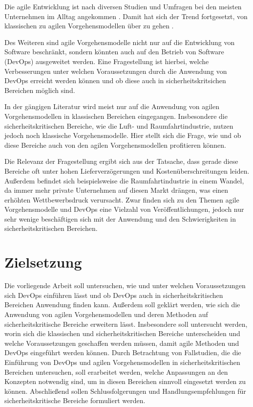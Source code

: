 Die agile Entwicklung ist nach diversen Studien und Umfragen bei den meisten Unternehmen im Alltag angekommen \parencite[vgl.][]{VersionOne:2015aa, HP:2015aa}. 
Damit hat sich der Trend fortgesetzt, von klassischen zu agilen Vorgehensmodellen über zu gehen \parencite[vgl.][]{Rodriguez:2012:SAL:2372251.2372275}.

Des Weiteren sind agile Vorgehensmodelle nicht nur auf die Entwicklung von Software beschränkt, sondern könnten auch auf den Betrieb von Software (DevOps) ausgeweitet werden.
Eine Fragestellung ist hierbei, welche Verbesserungen unter welchen Voraussetzungen durch die Anwendung von DevOps erreicht werden können und ob diese auch in sicherheitskritsichen Bereichen möglich sind.

In der gängigen Literatur wird meist nur auf die Anwendung von agilen Vorgehensmodellen in klassischen Bereichen eingegangen.
Insbesondere die sicherheitskritischen Bereiche, wie die Luft- und Raumfahrtindustrie, nutzen jedoch noch klassische Vorgehensmodelle.
Hier stellt sich die Frage, wie und ob diese Bereiche auch von den agilen Vorgehensmodellen profitieren können.

Die Relevanz der Fragestellung ergibt sich aus der Tatsache, dass gerade diese Bereiche oft unter hohen Lieferverzögerungen und Kostenüberschreitungen leiden.
Außerdem befindet sich beispielsweise die Raumfahrtindustrie in einem Wandel, da immer mehr private Unternehmen auf diesen Markt drängen, was einen erhöhten Wettbewerbsdruck verursacht.
Zwar finden sich zu den Themen agile Vorgehensmodelle und DevOps eine Vielzahl von Veröffentlichungen, jedoch nur sehr wenige beschäftigen sich mit der Anwendung und den Schwierigkeiten in sicherheitskritischen Bereichen.

\section{Zielsetzung}

Die vorliegende Arbeit soll untersuchen, wie und unter welchen Voraussetzungen sich DevOps einführen lässt und ob DevOps auch in sicherheitskritischen Bereichen Anwendung finden kann.
Außerdem soll geklärt werden, wie sich die Anwendung von agilen Vorgehensmodellen und deren Methoden auf sicherheitskritische Bereiche erweitern lässt.
Insbesondere soll untersucht werden, worin sich die klassischen und sicherheitskritischen Bereiche unterscheiden und welche Voraussetzungen geschaffen werden müssen, damit agile Methoden und DevOps eingeführt werden können.
Durch Betrachtung von Fallstudien, die die Einführung von DevOps und agilen Vorgehensmodellen in sicherheitskritischen Bereichen untersuchen, soll erarbeitet werden, welche Anpassungen an den Konzepten notwendig sind, um in diesen Bereichen sinnvoll eingesetzt werden zu können.
Abschließend sollen Schlussfolgerungen und Handlungsempfehlungen für sicherheitskritische Bereiche formuliert werden.


